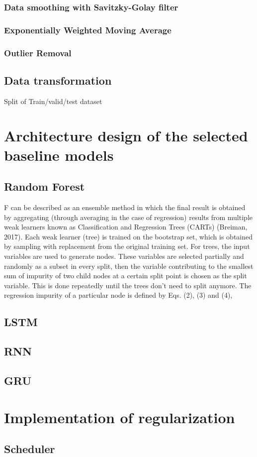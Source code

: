 \subsubsection{Data smoothing with Savitzky-Golay filter}
\subsubsection{Exponentially Weighted Moving Average}
\subsubsection{Outlier Removal}
\subsection{Data transformation}
Split of Train/valid/test dataset 
\section{Architecture design of the selected baseline models}
\subsection{Random Forest}
F can be described as an ensemble method in which the final result is obtained by aggregating (through averaging in the case of regression) results from multiple weak learners known as Classification and Regression Trees (CARTs) (Breiman, 2017). Each weak learner (tree) is trained on the bootstrap set, which is obtained by sampling with replacement from the original training set. For trees, the input variables are used to generate nodes. These variables are selected partially and randomly as a subset in every split, then the variable contributing to the smallest sum of impurity of two child nodes at a certain split point is chosen as the split variable. This is done repeatedly until the trees don't need to split anymore. The regression impurity of a particular node is defined by Eqs. (2), (3) and (4), \citep{wangMachineLearningFramework2021}
\subsection{LSTM}
\subsection{RNN}
\subsection{GRU}
\section{Implementation of regularization}
\subsection{Scheduler}
